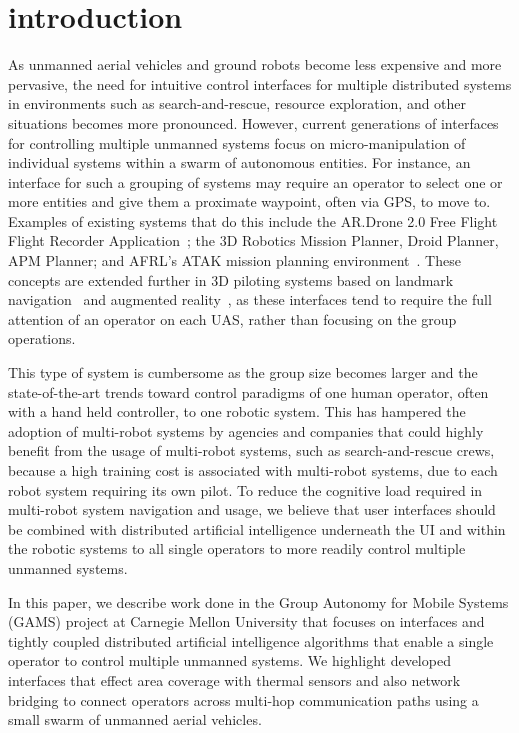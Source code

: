 \documentclass{sig-alternate-ipsn13}
\begin{document}
\section{introduction}

As unmanned aerial vehicles and ground robots become less expensive and more
pervasive, the need for intuitive control interfaces for multiple distributed
systems in environments such as search-and-rescue, resource exploration, and
other situations becomes more pronounced. However, current generations of
interfaces for controlling multiple unmanned systems focus on micro-manipulation
of individual systems within a swarm of autonomous entities. For instance, an
interface for such a grouping of systems may require an operator to select one
or more entities and give them a proximate waypoint, often via GPS, to move to.
Examples of existing systems that do this include the AR.Drone 2.0 Free Flight
Flight Recorder Application~\cite{irizarry2012usability};
the 3D Robotics Mission Planner, Droid Planner,
APM Planner; and AFRL's ATAK mission planning environment~\cite{gillen2012beyond}.
These concepts are extended further in 3D piloting systems based on landmark
navigation~\cite{ranft20133d} and augmented reality~\cite{kochflying}, as
these interfaces tend to require the full attention
of an operator on each UAS, rather than focusing on the group operations.

This type of system is cumbersome as the group size becomes larger and the
state-of-the-art trends toward control paradigms of one human operator, often
with a hand held controller, to one robotic system. This has hampered the
adoption of multi-robot systems by agencies and companies that could highly
benefit from the usage of multi-robot systems, such as search-and-rescue crews,
because a high training cost is associated with multi-robot systems, due to each
robot system requiring its own pilot. To reduce the cognitive load required in
multi-robot system navigation and usage, we believe that user interfaces should
be combined with distributed artificial intelligence underneath the UI and
within the robotic systems to all single operators to more readily control
multiple unmanned systems.

In this paper, we describe work done in the Group Autonomy for Mobile Systems
(GAMS) project at Carnegie Mellon University that focuses on interfaces and
tightly coupled distributed artificial intelligence algorithms that enable a single
operator to control multiple unmanned systems. We highlight developed interfaces
that effect area coverage with thermal sensors and also network bridging to
connect operators across multi-hop communication paths using a small swarm of
unmanned aerial vehicles.
\end{document}
